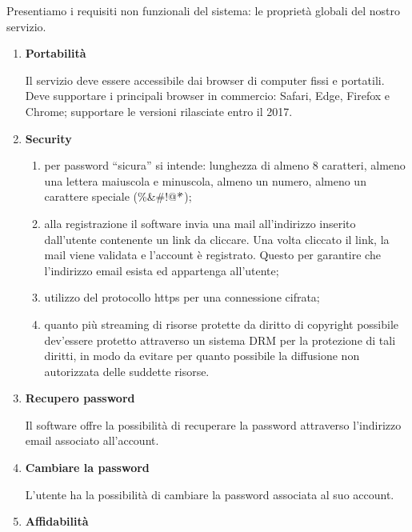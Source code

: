\documentclass[a4paper,12pt]{article}
\begin{document}
Presentiamo i requisiti non funzionali del sistema: le proprietà globali del nostro servizio.

\begin{enumerate}[label=\textbf{RNF\arabic*}\;, ref=\textbf{RNF\arabic*}]
    \item \label{portabilità} \textbf{Portabilità}
    
    Il servizio deve essere accessibile dai browser di computer fissi e portatili. Deve supportare i principali browser in commercio: Safari, Edge, Firefox e Chrome; supportare le versioni rilasciate entro il 2017.
    \item \label{security} \textbf{Security}
    
    \begin{enumerate}[label=\textbf{\alph*}, ref=\textbf{RNF2\alph*}, itemsep=0.5em]
        \item \label{password sicura} per password “sicura” si intende: lunghezza di almeno 8 caratteri, almeno una lettera maiuscola e minuscola, almeno un numero, almeno un carattere speciale (\%\&\#!@*\^\,);
        \item \label{email di verifica} alla registrazione il software invia una mail all’indirizzo inserito dall’utente contenente un link da cliccare. Una volta cliccato il link, la mail viene validata e l’account è registrato. Questo per garantire che l’indirizzo email esista ed appartenga all’utente;
        \item \label{protocollo https} utilizzo del protocollo https per una connessione cifrata;
        \item \label{DRM} quanto più streaming di risorse protette da diritto di copyright possibile dev’essere protetto attraverso un sistema DRM per la protezione di tali diritti, in modo da evitare per quanto possibile la diffusione non autorizzata delle suddette risorse.
    \end{enumerate}
    \item \label{recupero password nf} \textbf{Recupero password}
    
    Il software offre la possibilità di recuperare la password attraverso l’indirizzo email associato all’account.
    \item \label{cambiare password} \textbf{Cambiare la password}
    
    L'utente ha la possibilità di cambiare la password associata al suo account.
    \item \label{affidabilità} \textbf{Affidabilità}
    

\end{enumerate}
\end{document}
